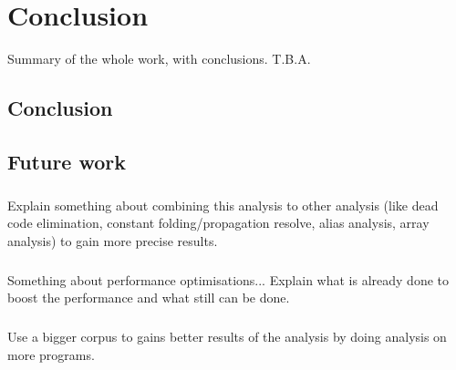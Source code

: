 \documentclass[main.tex]{subfiles}
\begin{document}
    \chapter{Conclusion}\label{chap:conclusion}
    Summary of the whole work, with conclusions. T.B.A.
    
    \section{Conclusion}
    
    \section{Future work}
    
    \paragraph{}
    Explain something about combining this analysis to other analysis (like dead code elimination, constant folding/propagation resolve, alias analysis, array analysis) to gain more precise results.
    
    \paragraph{}
    Something about performance optimisations... Explain what is already done to boost the performance and what still can be done.
        
    \paragraph{}
    Use a bigger corpus to gains better results of the analysis by doing analysis on more programs.
    
\end{document}
